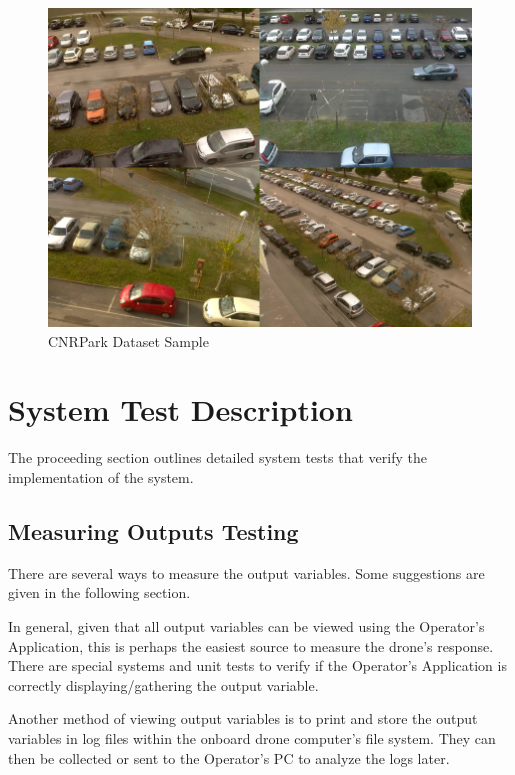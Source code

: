 \documentclass[12pt, titlepage]{article}
\begin{document}
\begin{figure}[h!]
  \begin{center} 
  \caption{CNRPark Dataset Sample}
  \label{CNRParkSample}
        \includegraphics[width=1\textwidth]{VnVPlan/CNRParkDataset.png}
  \end{center}
\end{figure}

\clearpage

\section{System Test Description}
\label{systemTest}
The proceeding section outlines detailed system tests that verify the implementation of the system.

\subsection{Measuring Outputs Testing}

There are several ways to measure the output variables. Some suggestions are given in the following section. 

In general, given that all output variables can be viewed using the Operator's Application, this is perhaps the easiest source to measure the drone's response. There are special systems and unit tests to verify if the Operator's Application is correctly displaying/gathering the output variable.

Another method of viewing output variables is to print and store the output variables in log files within the onboard drone computer's file system. They can then be collected or sent to the Operator's PC to analyze the logs later.
\end{document}
